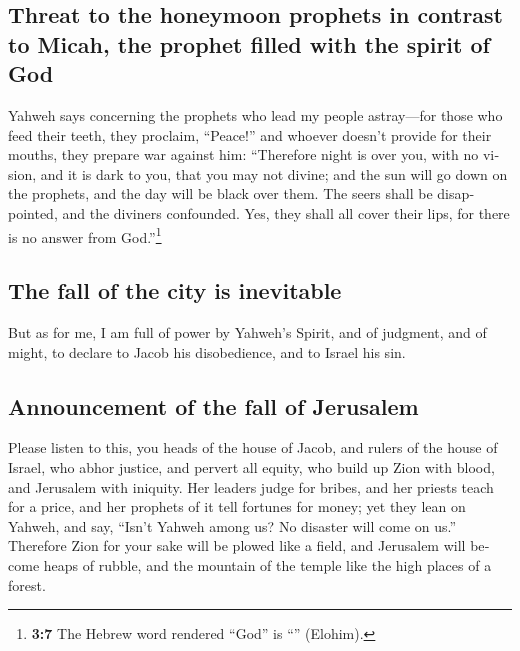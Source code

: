 \begin{paracol}{2}
\begin{otherlanguage}{english}
\hypertarget{threat-to-the-honeymoon-prophets-in-contrast-to-micah-the-prophet-filled-with-the-spirit-of-god}{%
\subsection{Threat to the honeymoon prophets in contrast to Micah, the
prophet filled with the spirit of
God}\label{threat-to-the-honeymoon-prophets-in-contrast-to-micah-the-prophet-filled-with-the-spirit-of-god}}

 Yahweh says concerning the prophets who lead my people
astray---for those who feed their teeth, they proclaim, ``Peace!'' and
whoever doesn't provide for their mouths, they prepare war against him:
 ``Therefore night is over you, with no vision, and it is
dark to you, that you may not divine; and the sun will go down on the
prophets, and the day will be black over them.  The seers
shall be disappointed, and the diviners confounded. Yes, they shall all
cover their lips, for there is no answer from God.''\footnote{\textbf{3:7}
  The Hebrew word rendered ``God'' is ``'' (Elohim).}

\hypertarget{the-fall-of-the-city-is-inevitable}{%
\subsection{The fall of the city is
inevitable}\label{the-fall-of-the-city-is-inevitable}}

 But as for me, I am full of power by Yahweh's Spirit, and
of judgment, and of might, to declare to Jacob his disobedience, and to
Israel his sin.

\hypertarget{announcement-of-the-fall-of-jerusalem}{%
\subsection{Announcement of the fall of
Jerusalem}\label{announcement-of-the-fall-of-jerusalem}}

 Please listen to this, you heads of the house of Jacob,
and rulers of the house of Israel, who abhor justice, and pervert all
equity,  who build up Zion with blood, and Jerusalem with
iniquity.  Her leaders judge for bribes, and her priests
teach for a price, and her prophets of it tell fortunes for money; yet
they lean on Yahweh, and say, ``Isn't Yahweh among us? No disaster will
come on us.''  Therefore Zion for your sake will be
plowed like a field, and Jerusalem will become heaps of rubble, and the
mountain of the temple like the high places of a forest.


\end{otherlanguage}
\end{paracol}
